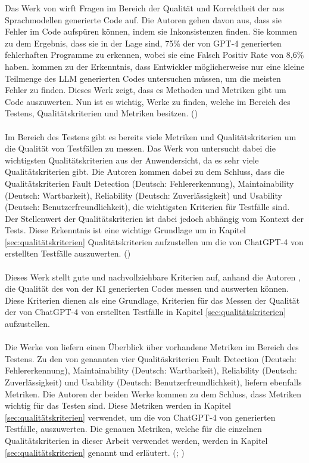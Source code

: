 \documentclass[12pt,toc=bib,toc=listof]{scrreprt}
\begin{document}
\noindent Das Werk von \textcite{Wang2024} wirft Fragen im Bereich der Qualität und Korrektheit der aus Sprachmodellen generierte Code auf. Die Autoren \textcite{Wang2024}  gehen davon aus, dass sie Fehler im Code aufspüren können, indem sie Inkonsistenzen finden. Sie kommen zu dem Ergebnis, dass sie in der Lage sind, 75\% der von GPT-4 generierten fehlerhaften Programme zu erkennen, wobei sie eine Falsch Positiv Rate von 8,6\% haben. \textcite{Wang2024} kommen zu der Erkenntnis, dass Entwickler möglicherweise nur eine kleine Teilmenge des LLM generierten Codes untersuchen müssen, um die meisten Fehler zu finden. Dieses Werk zeigt, dass es Methoden und Metriken gibt um Code auszuwerten. Nun ist es wichtig, Werke zu finden, welche im Bereich des Testens, Qualitätskriterien und Metriken besitzen. (\cite{Wang2024})\\
\\
Im Bereich des Testens gibt es bereits viele Metriken und Qualitätskriterien um die Qualität von Testfällen zu messen. Das Werk von \textcite{Tran2025} untersucht dabei die wichtigsten Qualitätskriterien aus der Anwendersicht, da es sehr viele Qualitätskriterien gibt.  Die Autoren \textcite{Tran2025} kommen dabei zu dem Schluss, dass die Qualitätskriterien Fault Detection (Deutsch: Fehlererkennung), Maintainability (Deutsch: Wartbarkeit), Reliability (Deutsch: Zuverlässigkeit) und Usability (Deutsch: Benutzerfreundlichkeit), die wichtigsten Kriterien für Testfälle sind. Der Stellenwert der Qualitätskriterien ist dabei jedoch abhängig vom Kontext der Tests. Diese Erkenntnis ist eine wichtige Grundlage um in Kapitel \ref{sec:qualitätskriterien} Qualitätskriterien aufzustellen um die von ChatGPT-4 von \textcite{OpenAI2025} erstellten Testfälle auszuwerten. (\cite{Tran2025})\\
\\
Dieses Werk stellt gute und nachvollziehbare Kriterien auf, anhand die Autoren \textcite{Wang2024}, die Qualität des von der KI generierten Codes messen und auswerten können. Diese Kriterien dienen als eine Grundlage, Kriterien für das Messen der Qualität der von ChatGPT-4 von \textcite{OpenAI2025} erstellten Testfälle in Kapitel \ref{sec:qualitätskriterien} aufzustellen.\\
\\
Die Werke von \parencite{Nirpals2011, Lazić2013} liefern einen Überblick über vorhandene Metriken im Bereich des Testens. Zu den von \textcite{Wang2024} genannten vier Qualitäskriterien  Fault Detection (Deutsch: Fehlererkennung), Maintainability (Deutsch: Wartbarkeit), Reliability (Deutsch: Zuverlässigkeit) und Usability (Deutsch: Benutzerfreundlichkeit), liefern \parencite{Nirpals2011, Lazić2013} ebenfalls Metriken. Die Autoren der beiden Werke \parencite{Nirpals2011, Lazić2013} kommen zu dem Schluss, dass Metriken wichtig für das Testen sind. Diese Metriken werden in Kapitel \ref{sec:qualitätskriterien} verwendet, um die von ChatGPT-4 von \textcite{OpenAI2025} generierten Testfälle, auszuwerten. Die genauen Metriken, welche für die einzelnen Qualitätskriterien in dieser Arbeit verwendet werden, werden in Kapitel \ref{sec:qualitätskriterien} genannt und erläutert. (\cite{Nirpals2011}; \cite{Lazić2013})\\
\newpage
\end{document}
